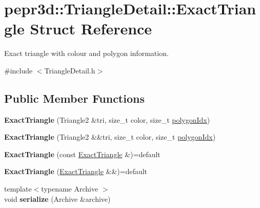 \hypertarget{structpepr3d_1_1_triangle_detail_1_1_exact_triangle}{}\section{pepr3d\+::Triangle\+Detail\+::Exact\+Triangle Struct Reference}
\label{structpepr3d_1_1_triangle_detail_1_1_exact_triangle}


Exact triangle with colour and polygon information.  




{\ttfamily \#include $<$Triangle\+Detail.\+h$>$}

\subsection*{Public Member Functions}
\begin{DoxyCompactItemize}
\item 
\mbox{\label{structpepr3d_1_1_triangle_detail_1_1_exact_triangle_a735227d6c7a1e7e6a4c4d53a5c640bfa}} 
{\bfseries Exact\+Triangle} (Triangle2 \&tri, size\+\_\+t color, size\+\_\+t \mbox{\hyperlink{structpepr3d_1_1_triangle_detail_1_1_exact_triangle_a111197095d54e403e689e775ecfe58c5}{polygon\+Idx}})
\item 
\mbox{\label{structpepr3d_1_1_triangle_detail_1_1_exact_triangle_a2e95c53007c71155c27f4763cbd91ad9}} 
{\bfseries Exact\+Triangle} (Triangle2 \&\&tri, size\+\_\+t color, size\+\_\+t \mbox{\hyperlink{structpepr3d_1_1_triangle_detail_1_1_exact_triangle_a111197095d54e403e689e775ecfe58c5}{polygon\+Idx}})
\item 
\mbox{\label{structpepr3d_1_1_triangle_detail_1_1_exact_triangle_a687c567eb29062f8a200cd28db2d92bf}} 
{\bfseries Exact\+Triangle} (const \mbox{\hyperlink{structpepr3d_1_1_triangle_detail_1_1_exact_triangle}{Exact\+Triangle}} \&)=default
\item 
\mbox{\label{structpepr3d_1_1_triangle_detail_1_1_exact_triangle_a7bec4a290c6558f4af998237da007043}} 
{\bfseries Exact\+Triangle} (\mbox{\hyperlink{structpepr3d_1_1_triangle_detail_1_1_exact_triangle}{Exact\+Triangle}} \&\&)=default
\item 
\mbox{\label{structpepr3d_1_1_triangle_detail_1_1_exact_triangle_a006ad644f94d22167d6e0a15c5e3a6c7}} 
{\footnotesize template$<$typename Archive $>$ }\\void {\bfseries serialize} (Archive \&archive)
\end{DoxyCompactItemize}
